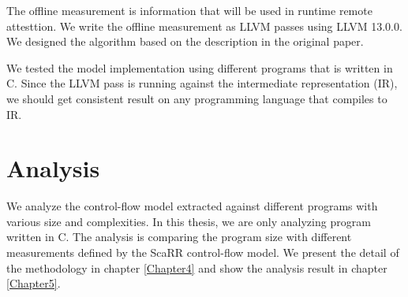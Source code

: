 The offline measurement is information that will be used in runtime remote
attesttion. We write the offline measurement as LLVM passes
\cite{lattnerLLVMINFRASTRUCTUREMULTISTAGE2002} using LLVM 13.0.0. We designed
the algorithm based on the description in the original paper. 

We tested the model implementation using different programs that is written in
C. Since the LLVM pass is running against the intermediate representation (IR),
we should get consistent result on any programming language that compiles to IR.

\section{Analysis}
\label{sec:analysis}

We analyze the control-flow model extracted against different programs with
various size and complexities. In this thesis, we are only analyzing program
written in C. The analysis is comparing the program size with different
measurements defined by the ScaRR control-flow model. We present the detail of
the methodology in chapter \ref{Chapter4} and show the analysis result in
chapter \ref{Chapter5}.